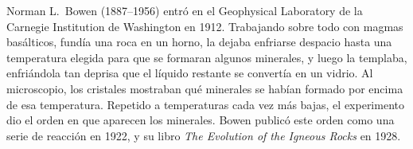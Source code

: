 \begin{history}
Norman L.~Bowen (1887--1956) entró en el Geophysical Laboratory de la
Carnegie Institution de Washington en 1912. Trabajando sobre todo con magmas
basálticos, fundía una roca en un horno, la dejaba enfriarse despacio hasta
una temperatura elegida para que se formaran algunos minerales, y luego la
templaba, enfriándola tan deprisa que el líquido restante se convertía en un
vidrio. Al microscopio, los cristales mostraban qué minerales se habían
formado por encima de esa temperatura. Repetido a temperaturas cada vez más
bajas, el experimento dio el orden en que aparecen los minerales. Bowen
publicó este orden como una serie de reacción en 1922, y su libro
\emph{The Evolution of the Igneous Rocks} en 1928.
\end{history}

